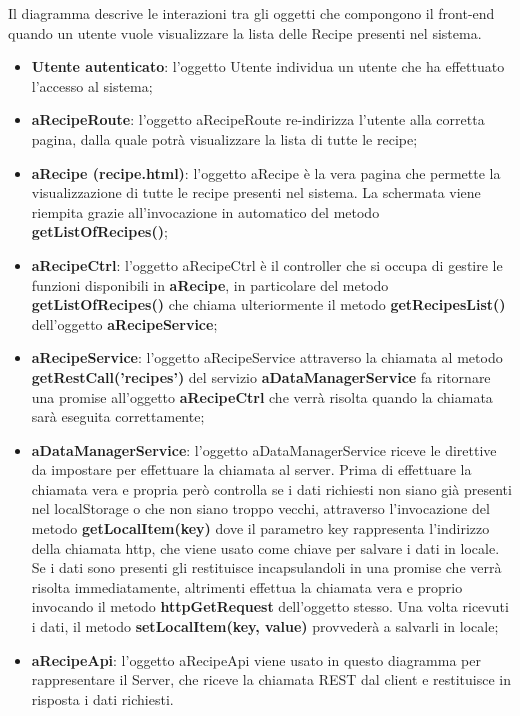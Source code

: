 	Il diagramma descrive le interazioni tra gli oggetti che compongono il front-end quando un utente vuole visualizzare la lista delle Recipe presenti nel sistema.
	\begin{itemize}
		\item \textbf{Utente autenticato}: l'oggetto Utente individua un utente che ha effettuato l'accesso al sistema;
		\item \textbf{aRecipeRoute}: l'oggetto aRecipeRoute re-indirizza l'utente alla corretta pagina, dalla quale potrà visualizzare la lista di tutte le recipe;
		\item \textbf{aRecipe (recipe.html)}: l'oggetto aRecipe è la vera pagina che permette la visualizzazione di tutte le recipe presenti nel sistema. La schermata viene riempita grazie all'invocazione in automatico del metodo \textbf{getListOfRecipes()};
		\item \textbf{aRecipeCtrl}: l'oggetto aRecipeCtrl è il controller che si occupa di gestire le funzioni disponibili in \textbf{aRecipe}, in particolare del metodo \textbf{getListOfRecipes()} che chiama ulteriormente il metodo \textbf{getRecipesList()} dell'oggetto \textbf{aRecipeService};
		\item \textbf{aRecipeService}: l'oggetto aRecipeService attraverso la chiamata al metodo \textbf{getRestCall('recipes')} del servizio \textbf{aDataManagerService} fa ritornare una promise all'oggetto \textbf{aRecipeCtrl} che verrà risolta quando la chiamata sarà eseguita correttamente;
		\item \textbf{aDataManagerService}: l'oggetto aDataManagerService riceve le direttive da impostare per effettuare la chiamata al server. Prima di effettuare la chiamata vera e propria però controlla se i dati richiesti non siano già presenti nel localStorage o che non siano troppo vecchi, attraverso l'invocazione del metodo \textbf{getLocalItem(key)} dove il parametro key rappresenta l'indirizzo della chiamata http, che viene usato come chiave per salvare i dati in locale. Se i dati sono presenti gli restituisce incapsulandoli in una promise che verrà risolta immediatamente, altrimenti effettua la chiamata vera e proprio invocando il metodo \textbf{httpGetRequest} dell'oggetto stesso. Una volta ricevuti i dati, il metodo \textbf{setLocalItem(key, value)} provvederà a salvarli in locale;

		\item \textbf{aRecipeApi}: l'oggetto aRecipeApi viene usato in questo diagramma per rappresentare il Server, che riceve la chiamata REST dal client e restituisce in risposta i dati richiesti.
	\end{itemize}

